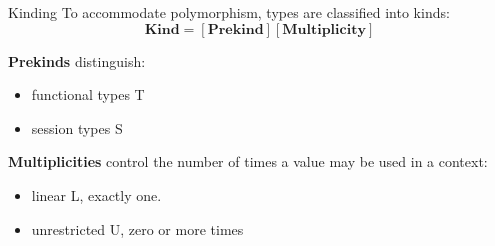 \documentclass[10pt]{beamer}
\begin{document}
\begin{frame}{Kinding}
To accommodate polymorphism, types are classified into kinds:
$$ \textbf{Kind} = [\textbf{Prekind}][\textbf{Multiplicity}] $$

\textbf{Prekinds} distinguish:
\begin{itemize}
	\item functional types T
	\item session types S
\end{itemize}

\textbf{Multiplicities} control the number of times a value may be used in a context:
\begin{itemize}
	\item linear L, exactly one.
	\item unrestricted U, zero or more times
\end{itemize}

\pause
\vspace*{-1cm}

  \hspace*{7cm}

\vspace*{5mm}

\end{frame}
\end{document}
